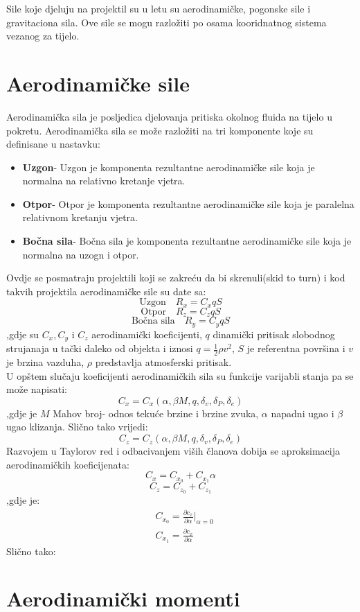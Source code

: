 
Sile koje djeluju na projektil su u letu su aerodinamičke, pogonske sile i 
gravitaciona sila. Ove sile se mogu razložiti po osama kooridnatnog sistema vezanog 
za tijelo. 
\section{Aerodinamičke sile}
Aerodinamička sila je posljedica djelovanja pritiska okolnog fluida na tijelo u pokretu. 
Aerodinamička sila se može razložiti na tri komponente koje su definisane u nastavku:
\begin{itemize}
    \item \textbf{Uzgon}- Uzgon je komponenta rezultantne aerodinamičke sile 
    koja je normalna na relativno kretanje vjetra.
    \item \textbf{Otpor}- Otpor je komponenta rezultantne aerodinamičke sile 
    koja je paralelna relativnom kretanju vjetra.
    \item \textbf{Bočna sila}- Bočna sila je komponenta rezultantne aerodinamičke sile 
    koja je normalna na uzogn i otpor. 
\end{itemize}
Ovdje se posmatraju projektili koji se zakreću da bi skrenuli(skid to turn) i 
kod takvih projektila aerodinamičke sile su date sa:
\begin{equation}
   \text{Uzgon} \quad R_x=C_xqS
\end{equation}
\begin{equation}
    \text{Otpor} \quad R_z=C_zqS
\end{equation}
\begin{equation}
    \text{Bočna sila} \quad R_y=C_yqS
\end{equation}
,gdje su $C_x,C_y$ i $C_z$ aerodinamički koeficijenti, $q$ dinamički pritisak slobodnog strujanaja
u tački daleko od objekta i iznosi $q=\frac{1}{2}\rho v^2$, $S$ je referentna površina i 
$v$ je brzina vazduha, $\rho$ predstavlja atmosferski pritisak.
\\
U opštem slučaju koeficijenti aerodinamičkih sila su funkcije varijabli stanja pa se može
napisati:
\begin{equation}
    C_x=C_x(\alpha ,\beta M,q,\delta_v,\delta_P,\delta_e)
\end{equation}
,gdje je $M$ Mahov broj- odnos tekuće brzine i brzine zvuka, $\alpha$ napadni ugao i 
$\beta$ ugao klizanja. Slično tako vrijedi:
\begin{equation}
    C_z=C_z(\alpha ,\beta M,q,\delta_v,\delta_P,\delta_e)
\end{equation}
Razvojem u Taylorov red i odbacivanjem viših članova dobija se aproksimacija 
aerodinamičkih koeficijenata:
\begin{equation}
    C_x=C_{x_0} + C_{x_1}\alpha
\end{equation}
\begin{equation}
    C_z=C_{z_0} + C_{z_1}
\end{equation}
,gdje je: 
\begin{align*}
   & C_{x_0}=\frac{\partial c_x}{\partial \alpha}|_{\alpha=0}\\ 
   & C_{x_1}=\frac{\partial c_x}{\partial \alpha}   
\end{align*}
Slično tako:


\section{Aerodinamički momenti}
